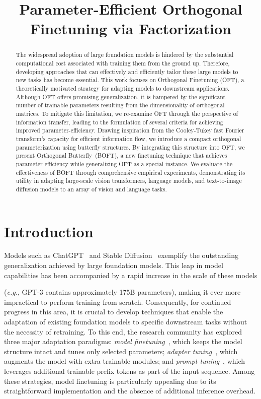 \title{Parameter-Efficient Orthogonal Finetuning via Factorization}

\begin{abstract}
The widespread adoption of large foundation models is hindered by the substantial computational cost associated with training them from the ground up. Therefore, developing approaches that can effectively and efficiently tailor these large models to new tasks has become essential. This work focuses on Orthogonal Finetuning (OFT), a theoretically motivated strategy for adapting models to downstream applications. Although OFT offers promising generalization, it is hampered by the significant number of trainable parameters resulting from the dimensionality of orthogonal matrices. To mitigate this limitation, we re-examine OFT through the perspective of information transfer, leading to the formulation of several criteria for achieving improved parameter-efficiency. Drawing inspiration from the Cooley-Tukey fast Fourier transform’s capacity for efficient information flow, we introduce a compact orthogonal parameterization using butterfly structures. By integrating this structure into OFT, we present Orthogonal Butterfly~(BOFT), a new finetuning technique that achieves parameter-efficiency while generalizing OFT as a special instance. We evaluate the effectiveness of BOFT through comprehensive empirical experiments, demonstrating its utility in adapting large-scale vision transformers, language models, and text-to-image diffusion models to an array of vision and language tasks.
\end{abstract}

\section{Introduction}

Models such as ChatGPT~\cite{brown2020language,chen2021evaluating} and Stable Diffusion~\cite{rombach2022high} exemplify the outstanding generalization achieved by large foundation models. This leap in model capabilities has been accompanied by a rapid increase in the scale of these models

(\emph{e.g.}, GPT-3 contains approximately 175B parameters), making it ever more impractical to perform training from scratch. Consequently, for continued progress in this area, it is crucial to develop techniques that enable the adaptation of existing foundation models to specific downstream tasks without the necessity of retraining. To this end, the research community has explored three major adaptation paradigms: \emph{model finetuning}~\cite{hulora2022,zaken2022bitfit,guo2020parameter,raffel2020exploring,qiu2023controlling,zhang2022adaptive,chavan2023one}, which keeps the model structure intact and tunes only selected parameters; \emph{adapter tuning}~\cite{rebuffi2017learning,houlsby2019parameter,pfeiffer2020adapterfusion,lin2020exploring,he2021towards}, which augments the model with extra trainable modules; and \emph{prompt tuning}~\cite{li2021prefix,lester2021power}, which leverages additional trainable prefix tokens as part of the input sequence. Among these strategies, model finetuning is particularly appealing due to its straightforward implementation and the absence of additional inference overhead.

